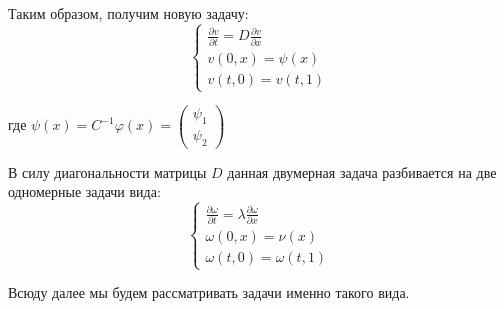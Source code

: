 \documentclass[titlepage]{article}
\def\l{\left}
\def\r{\right}
\def\part{\partial}
\begin{document}
Таким образом, получим новую задачу:
\begin{equation*}
 \begin{cases}
 	\frac{\part v}{\part t} = D\frac{\part v}{\part x}
 	\\
	v(0, x) = \psi(x)
	\\	
	v(t, 0) = v(t, 1)
 \end{cases}
\end{equation*}

где $\psi(x) = C^{-1}\varphi(x) = \l(\begin{matrix} \psi_1 \\ \psi_2 \end{matrix}\r)$

В силу диагональности матрицы $D$ данная двумерная задача разбивается на две одномерные задачи вида:
\begin{equation*}
 \begin{cases}
 	\frac{\part \omega}{\part t} = \lambda\frac{\part \omega}{\part x}
 	\\
	\omega(0, x) = \nu(x)
	\\	
	\omega(t, 0) = \omega(t, 1)
 \end{cases}
\end{equation*}

Всюду далее мы будем рассматривать задачи именно такого вида.
\end{document}
